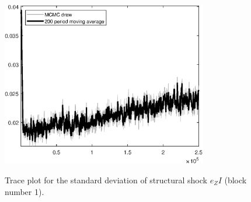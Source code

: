\begin{figure}[H]
\centering
  \includegraphics[width=0.8\textwidth]{BRS_est_shopping/graphs/TracePlot_SE_e_ZI_blck_1}\\
    \caption{Trace plot for the standard deviation of structural shock ${e_ZI}$ (block number 1).}
\end{figure}
